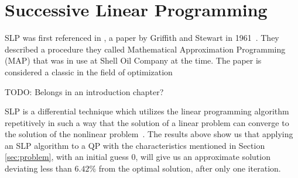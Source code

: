 \section{Successive Linear Programming}
SLP was first referenced in \cite{slp61}, a paper by Griffith and Stewart in
1961~\cite{boggs1985numerical}.
They described a procedure they called Mathematical Approximation Programming
(MAP) that was in use at Shell Oil Company at the time. The paper is considered
a classic in the field of optimization

TODO: Belongs in an introduction chapter?

SLP is a differential technique which utilizes the linear programming algorithm
repetitively in such a way that the solution of a linear problem can converge
to the solution of the nonlinear problem~\cite{slp61}. The results above show
us that applying an SLP algorithm to a QP with the characteristics mentioned in
Section \ref{sec:problem}, with an initial guess 0, will give us an approximate
solution deviating less than $6.42\%$ from the optimal solution, after only one
iteration.
